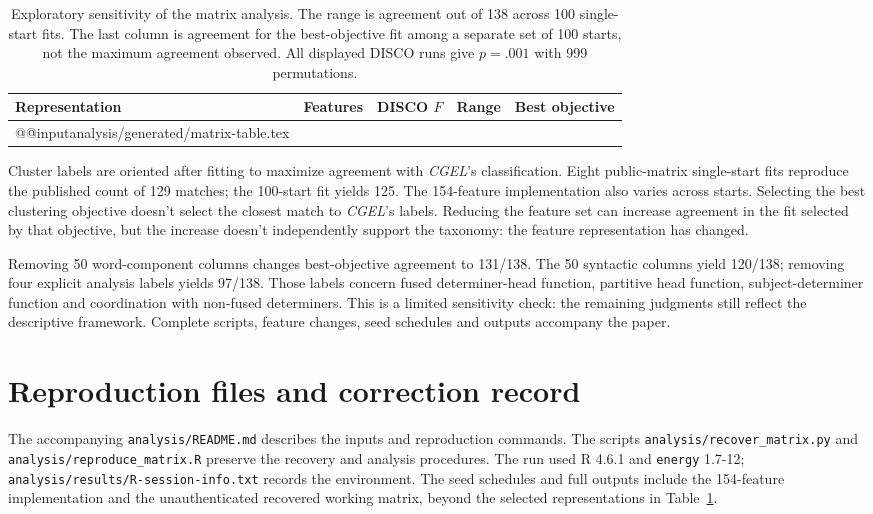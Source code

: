 \documentclass[12pt]{article}
\makeatletter
\newcommand{\tablebody}[1]{\csname @@input\endcsname #1 }
\makeatother
\begin{document}
\begin{table}[H]
\centering\small
\caption{Exploratory sensitivity of the matrix analysis. The range is agreement out of 138 across 100 single-start fits. The last column is agreement for the best-objective fit among a separate set of 100 starts, not the maximum agreement observed. All displayed DISCO runs give \mbox{$p=.001$} with 999 permutations.}\label{tab:matrix}
\begin{tabular}{>{\raggedright\arraybackslash}p{5.1cm}rrrr}
\toprule
Representation & Features & DISCO $F$ & Range & Best objective \\
\midrule
\tablebody{analysis/generated/matrix-table.tex}
\bottomrule
\end{tabular}
\end{table}

Cluster labels are oriented after fitting to maximize agreement with \textit{CGEL}'s classification. Eight public-matrix single-start fits reproduce the published count of 129 matches; the 100-start fit yields 125. The 154-feature implementation also varies across starts. Selecting the best clustering objective doesn't select the closest match to \textit{CGEL}'s labels. Reducing the feature set can increase agreement in the fit selected by that objective, but the increase doesn't independently support the taxonomy: the feature representation has changed.

Removing 50 word-component columns changes best-objective agreement to 131/138. The 50 syntactic columns yield 120/138; removing four explicit analysis labels yields 97/138. Those labels concern fused determiner-head function, partitive head function, subject-determiner function and coordination with non-fused determiners. This is a limited sensitivity check: the remaining judgments still reflect the descriptive framework. Complete scripts, feature changes, seed schedules and outputs accompany the paper.

\section{Reproduction files and correction record}

The accompanying \nolinkurl{analysis/README.md} describes the inputs and reproduction commands. The scripts \nolinkurl{analysis/recover_matrix.py} and \nolinkurl{analysis/reproduce_matrix.R} preserve the recovery and analysis procedures. The run used R 4.6.1 and \texttt{energy} 1.7-12; \nolinkurl{analysis/results/R-session-info.txt} records the environment. The seed schedules and full outputs include the 154-feature implementation and the unauthenticated recovered working matrix, beyond the selected representations in Table~\ref{tab:matrix}.
\end{document}
